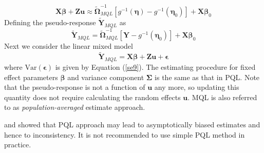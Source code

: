 		\[\bm {X\beta} + \bm {Zu} \approx \tilde{\bm \Omega}_{MQL}^{-1}[g^{-1}(\bm\eta)- g^{-1}(\bm \eta_0)]  + \bm{X}\bm \beta_0 \]
		Defining the pseudo-response $\tilde{\bm Y}_{MQL}$ as
		\begin{equation}\label{se10}
		\tilde{\bm Y}_{MQL} =  \tilde{\bm \Omega}_{MQL}^{-1}[\bm Y- g^{-1}(\bm \eta_0)]  + \bm{X}\bm \beta_0 
		\end{equation}
		Next we consider the linear mixed model 
		\[ \tilde{\bm Y}_{MQL}  = \bm {X\beta}+ \bm {Zu}  + \bm \epsilon\] 
		where $\text{Var}(\bm \epsilon) $ is given by Equation (\ref{se9}).  The estimating procedure for fixed effect parameters $\bm \beta$ and variance component $\bm \Sigma$ is the same as that in PQL. Note that the pseudo-response is not a function of $\bm u$ any more, so updating this quantity does not require calculating the random effects $\bm u$. MQL is also referred to as \textit{population-averaged} estimate approach.
		
		\cite{pinheiro2006efficient} and \cite{breslow1995bias} showed that PQL approach may lead to asymptotically biased estimates and hence to inconsistency. It is not recommended to use simple PQL method in practice. 
		
		

